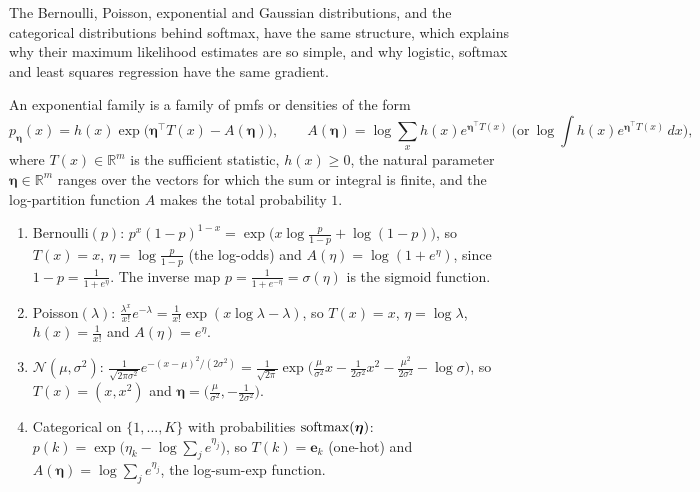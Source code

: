 The Bernoulli, Poisson, exponential and Gaussian distributions, and the categorical distributions behind softmax, have the same structure, which explains why their maximum likelihood estimates are so simple, and why logistic, softmax and least squares regression have the same gradient.

\begin{definition}\label{L4-def:exp-family}
    An exponential family is a family of pmfs or densities of the form
    \[p_{\boldsymbol{\eta}}(x) = h(x)\exp\big(\boldsymbol{\eta}^\top T(x) - A(\boldsymbol{\eta})\big), \qquad A(\boldsymbol{\eta}) = \log\sum_x h(x)e^{\boldsymbol{\eta}^\top T(x)} \ \Big(\text{or} \ \log\int h(x)e^{\boldsymbol{\eta}^\top T(x)}\, dx\Big),\]
    where $T(x) \in \mathbb{R}^m$ is the sufficient statistic, $h(x) \geq 0$, the natural parameter $\boldsymbol{\eta} \in \mathbb{R}^m$ ranges over the vectors for which the sum or integral is finite, and the log-partition function $A$ makes the total probability $1$.
\end{definition}

\begin{example}\label{L4-ex:exp-families}
    \begin{enumerate}
        \item Bernoulli$(p)$: $p^x(1 - p)^{1 - x} = \exp\big(x\log\frac{p}{1 - p} + \log(1 - p)\big)$, so $T(x) = x$, $\eta = \log\frac{p}{1 - p}$ (the log-odds) and $A(\eta) = \log(1 + e^\eta)$, since $1 - p = \frac{1}{1 + e^\eta}$. The inverse map $p = \frac{1}{1 + e^{-\eta}} = \sigma(\eta)$ is the sigmoid function.
        \item Poisson$(\lambda)$: $\frac{\lambda^x}{x!}e^{-\lambda} = \frac{1}{x!}\exp(x\log\lambda - \lambda)$, so $T(x) = x$, $\eta = \log\lambda$, $h(x) = \frac{1}{x!}$ and $A(\eta) = e^\eta$.
        \item $\mathcal{N}(\mu, \sigma^2)$: $\frac{1}{\sqrt{2\pi\sigma^2}}e^{-(x - \mu)^2/(2\sigma^2)} = \frac{1}{\sqrt{2\pi}}\exp\big(\frac{\mu}{\sigma^2}x - \frac{1}{2\sigma^2}x^2 - \frac{\mu^2}{2\sigma^2} - \log\sigma\big)$, so $T(x) = (x, x^2)$ and $\boldsymbol{\eta} = \big(\frac{\mu}{\sigma^2}, -\frac{1}{2\sigma^2}\big)$.
        \item Categorical on $\{1, \ldots, K\}$ with probabilities $\operatorname{softmax}(\boldsymbol{\eta})$: $p(k) = \exp\big(\eta_k - \log\sum_j e^{\eta_j}\big)$, so $T(k) = \mathbf{e}_k$ (one-hot) and $A(\boldsymbol{\eta}) = \log\sum_j e^{\eta_j}$, the log-sum-exp function.
    \end{enumerate}
\end{example}

